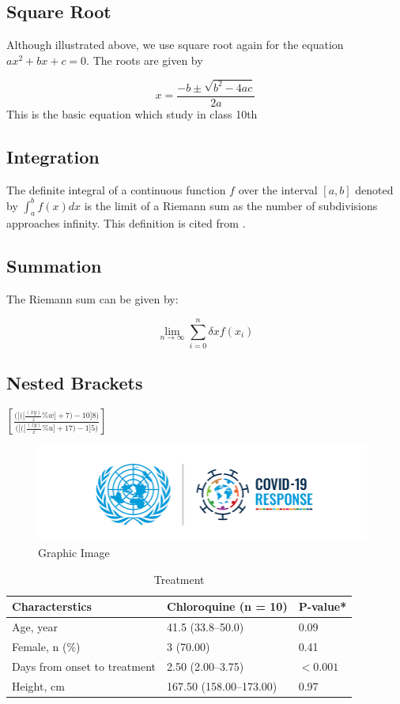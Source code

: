 \documentclass{article}
\begin{document}
\subsection{Square Root}

Although illustrated above, we use square root again for the equation \(ax^2 + bx + c = 0\). The roots are given by

\[
x = \frac{-b \pm \sqrt{b^2 - 4ac}}{2a}
\]
This is the basic equation which study in class 10th \cite{2}
\subsection{Integration}

The definite integral of a continuous function \(f\) over the interval \([a, b]\) denoted by \(\int_{a}^{b} f(x)dx\) is the limit of a Riemann sum as the number of subdivisions approaches infinity. This definition is cited from \cite{3}.

\subsection{Summation}

The Riemann sum can be given by:

\[
\lim_{{n \to \infty}} \sum_{{i=0}}^{n} \delta xf(x_i)
\]

\subsection{Nested Brackets}
$\left[ \frac{\Bigg(\bigg[\Big(\big[\frac{(xy)}{z} \% w\big]+ 7\Big)- 10\bigg]8\Bigg)}{\Bigg(\bigg[\Big(\big[\frac{(zy)}{x} \% u\big]+ 17\Big)- 1\bigg]5\Bigg)} \right]$
\newpage
\begin{figure}[h]
    \centering
    \includegraphics[width=11cm]{covid.png}
    \caption{Graphic Image}
    \label{fig:enter-label}
\end{figure}
\begin{table}[h!]
\centering
\begin{tabular}{|l|l|l|}
\hline
Characterstics & Chloroquine (n = 10) & P-value*\\
\hline \hline
Age, year & 41.5 (33.8–50.0) & 0.09 \\
\hline
Female, n (\%) & 3 (70.00) & 0.41 \\
\hline
Days from onset to treatment & 2.50 (2.00–3.75) & \(<0.001\) \\
\hline
Height, cm & 167.50 (158.00–173.00) & 0.97 \\
\hline
\end{tabular}
\caption{Treatment}
\end{table} 
\end{document}
